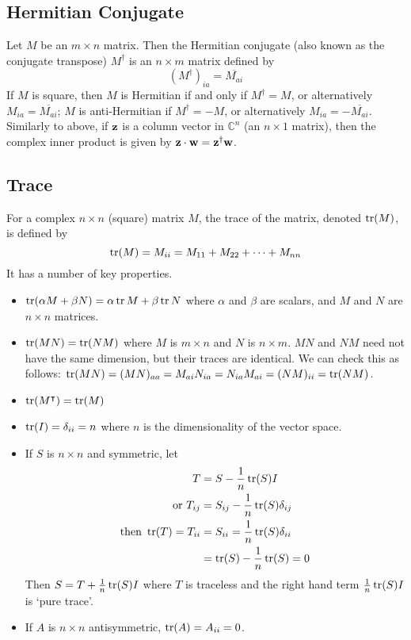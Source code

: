\documentclass{article}
\begin{document}
\subsection{Hermitian Conjugate}
Let $M$ be an $m \times n$ matrix. Then the Hermitian conjugate (also known as the conjugate transpose) $M^\dagger$ is an $n \times m$ matrix defined by
\[
	(M^\dagger)_{ia} = \overline{M_{ai}}
\]
If $M$ is square, then $M$ is Hermitian if and only if $M^\dagger = M$, or alternatively $M_{ia} = \overline{M_{ai}}$; $M$ is anti-Hermitian if $M^\dagger = -M$, or alternatively $M_{ia} = -\overline{M_{ai}}$. Similarly to above, if $\vb z$ is a column vector in $\mathbb C^n$ (an $n \times 1$ matrix), then the complex inner product is given by $\vb z \cdot \vb w = \vb z^\dagger \vb w$.

\subsection{Trace}
For a complex $n \times n$ (square) matrix $M$, the trace of the matrix, denoted $\tr(M)$, is defined by
\[ \tr(M) = M_{ii} = M_{11} + M_{22} + \cdots + M_{nn} \]
It has a number of key properties.
\begin{itemize}
	\item $\tr(\alpha M + \beta N) = \alpha \tr M + \beta \tr N$ where $\alpha$ and $\beta$ are scalars, and $M$ and $N$ are $n \times n$ matrices.
	\item $\tr(MN) = \tr(NM)$ where $M$ is $m \times n$ and $N$ is $n \times m$. $MN$ and $NM$ need not have the same dimension, but their traces are identical. We can check this as follows: $\tr(MN) = (MN)_{aa} = M_{ai} N_{ia} = N_{ia} M_{ai} = (NM)_{ii} = \tr(NM)$.
	\item $\tr(M^\intercal) = \tr(M)$
	\item $\tr(I) = \delta_{ii} = n$ where $n$ is the dimensionality of the vector space.
	\item If $S$ is $n \times n$ and symmetric, let
	      \begin{align*}
		      T                             & = S - \frac{1}{n}\tr(S) I                \\
		      \text{or } T_{ij}             & = S_{ij} - \frac{1}{n}\tr(S) \delta_{ij} \\
		      \text{then } \tr (T) = T_{ii} & = S_{ii} = \frac{1}{n}\tr(S) \delta_{ii} \\
		                                    & = \tr(S) - \frac{1}{n}\tr(S) = 0
	      \end{align*}
	      Then $S = T + \frac{1}{n}\tr(S)I$ where $T$ is traceless and the right hand term $\frac{1}{n}\tr(S)I$ is `pure trace'.
	\item If $A$ is $n \times n$ antisymmetric, $\tr(A) = A_{ii} = 0$.
\end{itemize}
\end{document}
